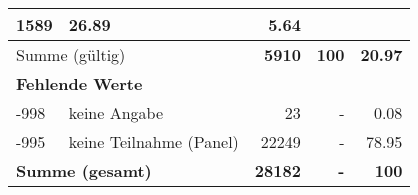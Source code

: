 \begin{longtable}{lXrrr}
       \num{1589} &
       \num[round-mode=places,round-precision=2]{26.89} &
         \num[round-mode=places,round-precision=2]{5.64} \\
     \midrule
     \multicolumn{2}{l}{Summe (gültig)} &
       \textbf{\num{5910}} &
     \textbf{100} &
       \textbf{\num[round-mode=places,round-precision=2]{20.97}} \\
     \multicolumn{5}{l}{\textbf{Fehlende Werte}}\\
       -998 &
       keine Angabe &
         \num{23} &
        - &
         \num[round-mode=places,round-precision=2]{0.08} \\
       -995 &
       keine Teilnahme (Panel) &
         \num{22249} &
        - &
         \num[round-mode=places,round-precision=2]{78.95} \\
     \midrule
     \multicolumn{2}{l}{\textbf{Summe (gesamt)}} &
          \textbf{\num{28182}} &
        \textbf{-} &
        \textbf{100} \\
     \bottomrule
     \end{longtable}
     
